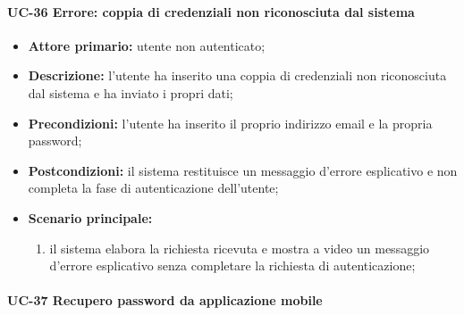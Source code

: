 \paragraph{UC-36 Errore: coppia di credenziali non riconosciuta dal sistema}

	\begin{itemize}
		\item \textbf{Attore primario:} utente non autenticato;

		\item \textbf{Descrizione:} l'utente ha inserito una coppia di credenziali non riconosciuta dal sistema e ha inviato i propri dati;

		\item \textbf{Precondizioni:} l'utente ha inserito il proprio indirizzo email e la propria password;

		\item \textbf{Postcondizioni:} il sistema restituisce un messaggio d'errore esplicativo e non completa la fase di autenticazione dell'utente;

		\item \textbf{Scenario principale:}
	  		\begin{enumerate}
		  		\item il sistema elabora la richiesta ricevuta e mostra a video un messaggio d'errore esplicativo senza completare la richiesta di autenticazione; 
	  		\end{enumerate}
	\end{itemize}

\paragraph{UC-37 Recupero password da applicazione mobile}

